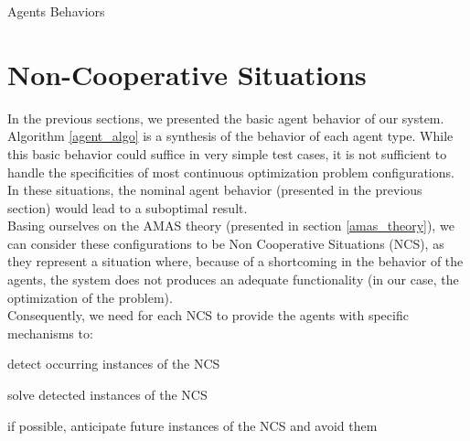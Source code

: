 \begin{algorithm}
\caption{Agents Behaviors}\label{agent_algo}






\end{algorithm}


\section{Non-Cooperative Situations}\label{NCS_pres}

In the previous sections, we presented the basic agent behavior of our system. Algorithm \ref{agent_algo} is a synthesis of the behavior of each agent type. While this basic behavior could suffice in very simple test cases, it is not sufficient to handle the specificities of most continuous optimization problem configurations. In these situations, the nominal agent behavior (presented in the previous section) would lead to a suboptimal result.\\
Basing ourselves on the AMAS theory (presented in section \ref{amas_theory}), we can consider these configurations to be Non Cooperative Situations (NCS), as they represent a situation where, because of a shortcoming in the behavior of the agents, the system does not produces an adequate functionality (in our case, the optimization of the problem).\\
Consequently, we need for each NCS to provide the agents with specific mechanisms to:
\begin{compactenum}
\item detect occurring instances of the NCS
\item solve detected instances of the NCS
\item if possible, anticipate future instances of the NCS and avoid them
\end{compactenum}

